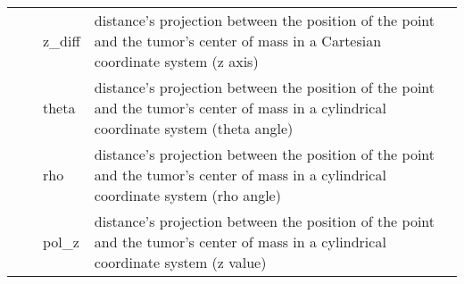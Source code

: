 \begin{table}[!h]
\begin{tabular}{|p{16mm}|p{34mm}|p{15mm}|p{90mm}|}
                                                                     &                                                                                                                                                                                                                                                                                                                                    & z\_diff                                                             & distance's projection between the position of the point and the tumor's center of mass in a Cartesian coordinate system (z axis)          \\ \cline{3-4} 
                                                                     &                                                                                                                                                                                                                                                                                                                                    & theta                                                               & distance's projection between the position  of the point and the tumor's  center of mass in a cylindrical coordinate system (theta angle) \\ \cline{3-4} 
                                                                     &                                                                                                                                                                                                                                                                                                                                    & rho                                                                 & distance's projection between the position  of the point and the tumor's  center of mass in a cylindrical coordinate system (rho angle)   \\ \cline{3-4} 
                                                                     &                                                                                                                                                                                                                                                                                                                                    & pol\_z                                                              & distance's projection between the position  of the point and the tumor's  center of mass in a cylindrical coordinate system (z value)     \\ \hline

\end{tabular}
\end{table}
